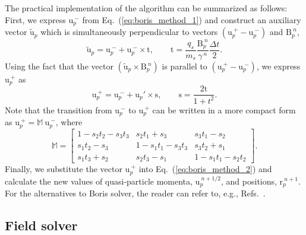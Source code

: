 \documentclass[10pt, a4paper, twoside, openright]{report}
\renewcommand{\vec}[1]{\boldsymbol{\mathrm{#1}}}
\begin{document}
The practical implementation of the algorithm can be summarized as follows: First, we express $ \vec{u}_{p}^{\:-} $ from Eq.~(\ref{eq:boris_method_1}) and construct an auxiliary vector $ \tilde{\vec{u}}_{p} $ which is simultaneously perpendicular to vectors $ \left(\vec{u}_{p}^{\:+} - \vec{u}_{p}^{\:-} \right) $ and $ \vec{B}_{p}^{\:n} $,
\begin{equation}
	\tilde{\vec{u}}_{p} = \vec{u}_{p}^{\:-} + \vec{u}_{p}^{\:-} \times \vec{t}, \qquad \vec{t} = \frac{q_s}{m_s} \frac{\vec{B}_p^{\:n}}{\gamma^{\:n}} \frac{\Delta t}{2}.
\end{equation}
Using the fact that the vector $ (\tilde{\vec{u}}_{p} \times \vec{B}_{p}^{\:n}) $ is parallel to $ \left(\vec{u}_{p}^{\:+} - \vec{u}_{p}^{\:-} \right) $, we express $ \vec{u}_{p}^{\:+} $ as
\begin{equation}
	\vec{u}_{p}^{\:+} = \vec{u}_{p}^{\:-} + \vec{u}_{p}\!' \times \vec{s}, \qquad \vec{s} = \frac{2\vec{t}}{1 + t^2}.
\end{equation}
Note that the transition from $ \vec{u}_{p}^{\:-} $ to $ \vec{u}_{p}^{\:+} $ can be written in a more compact form as $ \vec{u}_{p}^{\:+} = \mathbb{M} \: \vec{u}_{p}^{\:-} $, where
\begin{equation}
	\mathbb{M} = 
	\begin{bmatrix}
		1 - s_{2}t_{2} - s_{3}t_{3} & s_{2}t_{1} + s_{3} & s_{3}t_{1} - s_{2} \\
		s_{1}t_{2} - s_{3} & 1 - s_{1}t_{1} - s_{3}t_{3} & s_{3}t_{2} + s_{1} \\
		s_{1}t_{3} + s_{2} & s_{2}t_{3} - s_{1} & 1 - s_{1}t_{1} - s_{2}t_{2}
	\end{bmatrix}.
\end{equation}
Finally, we substitute the vector $ \vec{u}_{p}^{\:+} $ into Eq.~(\ref{eq:boris_method_2}) and calculate the new values of quasi-particle momenta, $ \vec{u}_{p}^{\:n+1/2} $, and positions, $ \vec{r}_{p}^{\:n+1} $. For the alternatives to Boris solver, the reader can refer to, e.g., Refs.~.

\subsection{Field solver}
\end{document}
